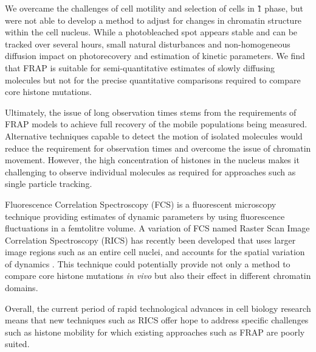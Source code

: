    We overcame the challenges of cell motility
    and selection of cells in \G1{} phase,
    but were not able to develop a method to adjust
    for changes in chromatin structure within the cell nucleus.
    While a photobleached spot appears stable and
    can be tracked over several hours,
    small natural disturbances and non-homogeneous diffusion
    impact on photorecovery
    and estimation of kinetic parameters.
    We find that FRAP is suitable for semi-quantitative
    estimates of slowly diffusing molecules
    but not for the precise quantitative comparisons
    required to compare core histone mutations.

    Ultimately, the issue of long observation times stems from the
    requirements of FRAP models to achieve full recovery of the mobile
    populations being measured.  Alternative techniques capable to
    detect the motion of isolated molecules would reduce the
    requirement for observation times and overcome the issue of
    chromatin movement.  However, the high concentration of histones
    in the nucleus makes it challenging to observe individual
    molecules as required for approaches such as single particle
    tracking.

    Fluorescence Correlation Spectroscopy (FCS) is a fluorescent
    microscopy technique providing estimates of dynamic parameters by
    using fluorescence fluctuations in a femtolitre volume.  A
    variation of FCS named Raster Scan Image Correlation Spectroscopy
    (RICS) has recently been developed that uses larger image regions
    such as an entire cell nuclei, and accounts for the spatial
    variation of dynamics \citep{digman2005rics}.  This technique
    could potentially provide not only a method to compare core
    histone mutations \textit{in vivo} but also their effect in
    different chromatin domains.

    Overall, the current period of rapid technological advances in
    cell biology research means that new techniques such as RICS offer
    hope to address specific challenges such as histone mobility for
    which existing approaches such as FRAP are poorly suited.



